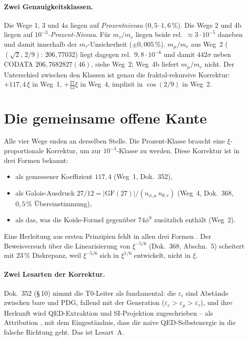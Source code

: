\paragraph{Zwei Genauigkeitsklassen.}
Die Wege 1, 3 und 4a liegen auf \emph{Prozentniveau} ($0{,}5$--$1{,}6\,\%$).
Die Wege 2 und 4b liegen auf \emph{$10^{-3}$-Prozent-Niveau}. Für $m_\tau/m_e$
liegen beide rel.\ ${\approx}3\cdot10^{-5}$ daneben und damit innerhalb der
$m_\tau$-Unsicherheit ($\pm0{,}005\,\%$). $m_\mu/m_e$ aus Weg~2
($(\sqrt2,\,2/9)$: $206{,}77032$) liegt dagegen rel.\ $9{,}8\cdot10^{-6}$ und
damit $442\sigma$ neben CODATA $206{,}7682827(46)$, siehe Weg~2; Weg~4b liefert
$m_\mu/m_e$ nicht. Der Unterschied zwischen den Klassen ist genau
die fraktal-rekursive Korrektur: $+117{,}4\,\xi$ in Weg~1, $+\tfrac{27}{12}\xi$ in
Weg~4, implizit in $\cos(2/9)$ in Weg~2.

\section{Die gemeinsame offene Kante}

Alle vier Wege enden an derselben Stelle. Die Prozent-Klasse braucht eine
$\xi$-proportionale Korrektur, um zur $10^{-3}$-Klasse zu werden. Diese Korrektur
ist in drei Formen bekannt:
\begin{itemize}
  \item als gemessener Koeffizient $117{,}4$ (Weg~1, Dok.~352),
  \item als Galois-Ausdruck $27/12 = |\text{GF}(27)|/(n_{\phi,\mu}\,n_{\theta,e})$
    (Weg~4, Dok.~368, $0{,}5\,\%$ Übereinstimmung),
  \item als das, was die Koide-Formel gegenüber $74\phi^8$ zusätzlich enthält
    (Weg~2).
\end{itemize}
Eine Herleitung aus ersten Prinzipien fehlt in allen drei Formen \SM. Der
Beweisversuch über die Linearisierung von $\xi^{-5/6}$ (Dok.~368, Abschn.~5)
scheitert mit $23\,\%$ Diskrepanz, weil $\xi^{-5/6}$ sich in $\xi^{1/6}$
entwickelt, nicht in $\xi$.

\paragraph{Zwei Lesarten der Korrektur.}
Dok.~352 (§\,10) nimmt die T0-Leiter als fundamental: die $\varepsilon_i$ sind
Abstände zwischen bare und PDG, fallend mit der Generation
($\varepsilon_e>\varepsilon_\mu>\varepsilon_\tau$), und ihre Herkunft wird
QED-Extraktion und SI-Projektion zugeschrieben -- als Attribution \SM, mit dem
Eingeständnis, dass die naive QED-Selbstenergie in die falsche Richtung geht.
Das ist Lesart~A.

